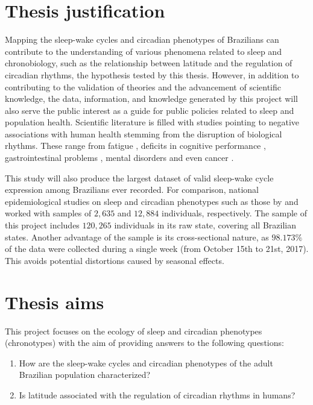 \documentclass[
12pt,
openright,
oneside,
a4paper,
chapter=TITLE,
section=TITLE,
french,
spanish,
brazil,
english
]{abntex2}\usepackage{array}
\begin{document}
\section{Thesis justification}\label{thesis-justification}

Mapping the sleep-wake cycles and circadian phenotypes of Brazilians can
contribute to the understanding of various phenomena related to sleep
and chronobiology, such as the relationship between latitude and the
regulation of circadian rhythms, the hypothesis tested by this thesis.
However, in addition to contributing to the validation of theories and
the advancement of scientific knowledge, the data, information, and
knowledge generated by this project will also serve the public interest
as a guide for public policies related to sleep and population health.
Scientific literature is filled with studies pointing to negative
associations with human health stemming from the disruption of
biological rhythms. These range from fatigue \autocite{tryon2004},
deficits in cognitive performance \autocite{dongen2003} ,
gastrointestinal problems \autocite{fido2008,morito2014,mortas2020},
mental disorders \autocite{jones2005,kalmbach2015,roh2012} and even
cancer \autocite{lie2006,papantoniou2015,schernhammer2001}.

This study will also produce the largest dataset of valid sleep-wake
cycle expression among Brazilians ever recorded. For comparison,
national epidemiological studies on sleep and circadian phenotypes such
as those by \textcite{drager2022} and \textcite{leocadio-miguel2017}
worked with samples of \(2,635\) and \(12,884\) individuals,
respectively. The sample of this project includes \(120,265\)
individuals in its raw state, covering all Brazilian states. Another
advantage of the sample is its cross-sectional nature, as \(98.173\%\)
of the data were collected during a single week (from October 15th to
21st, 2017). This avoids potential distortions caused by seasonal
effects.

\section{Thesis aims}\label{thesis-aims}

This project focuses on the ecology of sleep and circadian phenotypes
(chronotypes) with the aim of providing answers to the following
questions:

\begin{enumerate}
\def\labelenumi{\arabic{enumi}.}
\item
  How are the sleep-wake cycles and circadian phenotypes of the adult
  Brazilian population characterized?
\item
  Is latitude associated with the regulation of circadian rhythms in
  humans?
\end{enumerate}
\end{document}

